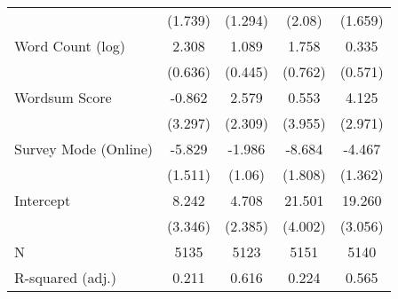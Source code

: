 \begin{table}[h]
\begin{tabular}{lcccc}
   & (1.739) & (1.294) & (2.08) & (1.659) \\ 
  Word Count (log) &   2.308 &   1.089 &   1.758 &   0.335 \\ 
   & (0.636) & (0.445) & (0.762) & (0.571) \\ 
  Wordsum Score &  -0.862 &   2.579 &   0.553 &   4.125 \\ 
   & (3.297) & (2.309) & (3.955) & (2.971) \\ 
  Survey Mode (Online) &  -5.829 &  -1.986 &  -8.684 &  -4.467 \\ 
   & (1.511) & (1.06) & (1.808) & (1.362) \\ 
  Intercept &   8.242 &   4.708 &  21.501 &  19.260 \\ 
   & (3.346) & (2.385) & (4.002) & (3.056) \\ 
   \hline
N & 5135 & 5123 & 5151 & 5140 \\ 
  R-squared (adj.) & 0.211 & 0.616 & 0.224 & 0.565 \\ 
   \hline
\end{tabular}
\endgroup
\end{table}
